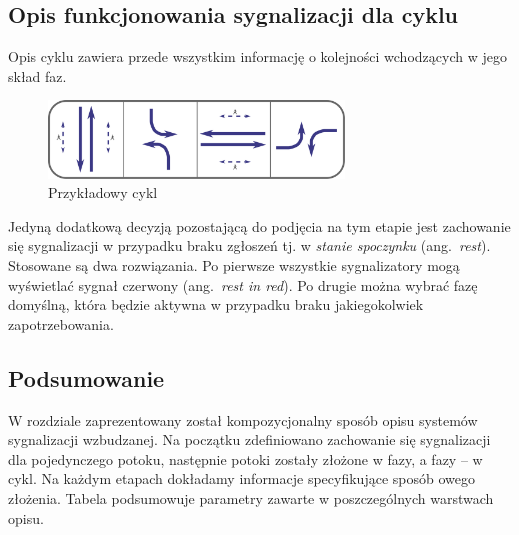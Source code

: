 \documentclass{pracamgr}
\newcommand{\ang}[1]{(ang.~\emph{#1})}
\theoremstyle{plain}
\begin{document}
\subsection{Opis funkcjonowania sygnalizacji dla cyklu} Opis cyklu
zawiera przede wszystkim informację o kolejności wchodzących w jego
skład faz.
\begin{figure}[h] \centering
  \includegraphics[width=0.7\textwidth]{img/signals-cycle-example}
  \caption{Przykładowy cykl}
\end{figure}

Jedyną dodatkową decyzją pozostającą do podjęcia na tym etapie jest
zachowanie się sygnalizacji w przypadku braku zgłoszeń tj. w
\emph{stanie spoczynku} \ang{rest}. Stosowane są dwa rozwiązania. Po
pierwsze wszystkie sygnalizatory mogą wyświetlać sygnał czerwony
\ang{rest in red}. Po drugie można wybrać fazę domyślną, która będzie
aktywna w przypadku braku jakiegokolwiek zapotrzebowania.

\subsection{Podsumowanie}

W rozdziale zaprezentowany został kompozycjonalny sposób opisu
systemów sygnalizacji wzbudzanej. Na początku zdefiniowano zachowanie
się sygnalizacji dla pojedynczego potoku, następnie potoki zostały
złożone w fazy, a fazy -- w cykl. Na każdym etapach dokładamy
informacje specyfikujące sposób owego złożenia.
Tabela \label{tab:signal-layer-params} podsumowuje parametry zawarte w
poszczególnych warstwach opisu.
\end{document}

